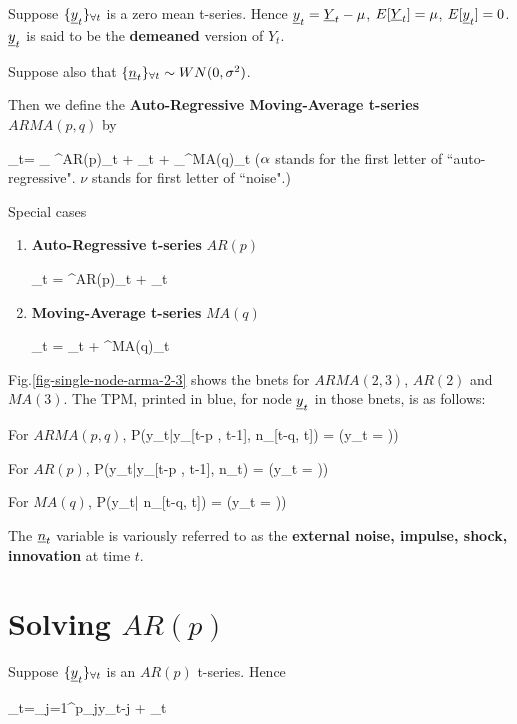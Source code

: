 Suppose ${\{{\underline{y}}_t\}_{\forall t}}$
is a zero mean t-series. Hence
${\underline{y}}_t= {\underline{Y}}_t-\mu$,
$E[{\underline{Y}}_t]=\mu$,
$E[{\underline{y}}_t]=0$.
${\underline{y}}_t$ is said to be the {\bf demeaned}
version of $Y_t$.

Suppose also that
${\{{\underline{n}}_t\}_{\forall t}}\sim WN(0, \sigma^2)$.

Then we define the
{\bf Auto-Regressive Moving-Average
t-series} $ARMA(p,q)$ by

\beq
\rvy_t=
_
{\caly^{AR(p)}_t}
+ \rvn_t +
_{\caly^{MA(q)}_t}
\label{eq-arma-def}
\eeq($\alpha$ stands for
the first  letter
of ``auto-regressive".
$\nu$ stands for first
 letter of ``noise".)


Special cases
\begin{enumerate}
\item  {\bf Auto-Regressive t-series} $AR(p)$

\beq
\rvy_t =
\caly^{AR(p)}_t
+ \rvn_t
\label{eq-ar-def}
\eeq

\item {\bf Moving-Average t-series}
 $MA(q)$

\beq
\rvy_t = \rvn_t  +
\caly^{MA(q)}_t
\label{eq-ma-def}
\eeq
\end{enumerate}




 Fig.\ref{fig-single-node-arma-2-3}
shows the bnets for
$ARMA(2,3)$, $AR(2)$ and $MA(3)$.
The TPM, printed in blue,
for node ${\underline{y}}_t$
in those bnets,
is as follows:

For $ARMA(p,q)$,
\beq\color{blue}
P(y_t|y_{[t-p   , t-1]},
n_{[t-q, t]})
=
\indi(y_t = ))
\eeq

For $AR(p)$,
\beq\color{blue}
P(y_t|y_{[t-p   , t-1]},
n_{t})
=
\indi(y_t = ))
\eeq

For $MA(q)$,
\beq\color{blue}
P(y_t|
n_{[t-q, t]})
=
\indi(y_t = ))
\eeq



The ${\underline{n}}_t$ variable
is variously referred to as the
{\bf external noise, impulse,
shock, innovation}
at time $t$.

\section{Solving $AR(p)$}

Suppose ${\{{\underline{y}}_t\}_{\forall t}}$ is an $AR(p)$
t-series. Hence

\beq
\rvy_t=\sum_{j=1}^p\alp_jy_{t-j} + \rvn_t
\eeq


